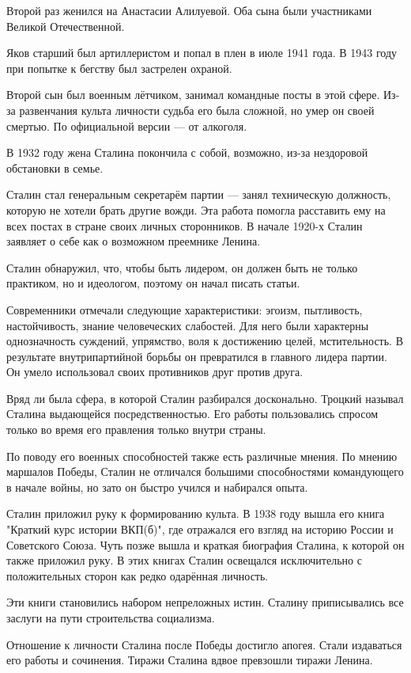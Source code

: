 \documentclass{article}
\begin{document}
Второй раз женился на Анастасии Алилуевой. Оба сына были участниками Великой Отечественной.

Яков старший был артиллеристом и попал в плен в июле 1941 года. В 1943 году при попытке к бегству был застрелен охраной.

Второй сын был военным лётчиком, занимал командные посты в этой сфере. Из-за развенчания культа личности судьба его была сложной, но умер он своей смертью. По официальной версии --- от алкоголя.

В 1932 году жена Сталина покончила с собой, возможно, из-за нездоровой обстановки в семье.

Сталин стал генеральным секретарём партии --- занял техническую должность, которую не хотели брать другие вожди. Эта работа помогла расставить ему на всех постах в стране своих личных сторонников. В начале 1920-х Сталин заявляет о себе как о возможном преемнике Ленина.

Сталин обнаружил, что, чтобы быть лидером, он должен быть не только практиком, но и идеологом, поэтому он начал писать статьи.

Современники отмечали следующие характеристики: эгоизм, пытливость, настойчивость, знание человеческих слабостей. Для него были характерны однозначность суждений, упрямство, воля к достижению целей, мстительность. В результате внутрипартийной борьбы он превратился в главного лидера партии. Он умело использовал своих противников друг против друга.

Вряд ли была сфера, в которой Сталин разбирался досконально. Троцкий называл Сталина выдающейся посредственностью. Его работы пользовались спросом только во время его правления только внутри страны.

По поводу его военных способностей также есть различные мнения. По мнению маршалов Победы, Сталин не отличался большими способностями командующего в начале войны, но зато он быстро учился и набирался опыта.

Сталин приложил руку к формированию культа. В 1938 году вышла его книга "Краткий курс истории ВКП(б)", где отражался его взгляд на историю России и Советского Союза. Чуть позже вышла и краткая биография Сталина, к которой он также приложил руку. В этих книгах Сталин освещался исключительно с положительных сторон как редко одарённая личность.

Эти книги становились набором непреложных истин. Сталину приписывались все заслуги на пути строительства социализма.

Отношение к личности Сталина после Победы достигло апогея. Стали издаваться его работы и сочинения. Тиражи Сталина вдвое превзошли тиражи Ленина.
\end{document}
